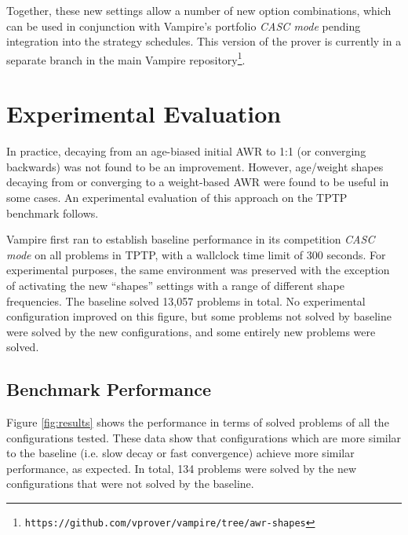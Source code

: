 \documentclass{llncs}
\begin{document}
Together, these new settings allow a number of new option combinations, which can be used in conjunction with Vampire's portfolio \emph{CASC mode} pending integration into the strategy schedules.
This version of the prover is currently in a separate branch in the main Vampire repository\footnote{\texttt{https://github.com/vprover/vampire/tree/awr-shapes}}.

\section{Experimental Evaluation}
\label{sec:experiments}


In practice, decaying from an age-biased initial AWR to 1:1 (or converging backwards) was not found to be an improvement.
However, age/weight shapes decaying from or converging to a weight-based AWR were found to be useful in some cases.
An experimental evaluation of this approach on the TPTP~\cite{tptp} benchmark follows.

Vampire first ran to establish baseline performance in its competition \emph{CASC mode} on all problems in TPTP, with a wallclock time limit of 300 seconds.
For experimental purposes, the same environment was preserved with the exception of activating the new ``shapes'' settings with a range of different shape frequencies.
The baseline solved 13,057 problems in total.
No experimental configuration improved on this figure, but some problems not solved by baseline were solved by the new configurations, and some entirely new problems were solved.

\subsection{Benchmark Performance}
Figure \ref{fig:results} shows the performance in terms of solved problems of all the configurations tested.
These data show that configurations which are more similar to the baseline (i.e. slow decay or fast convergence) achieve more similar performance, as expected.
In total, 134 problems were solved by the new configurations that were not solved by the baseline.
\end{document}
